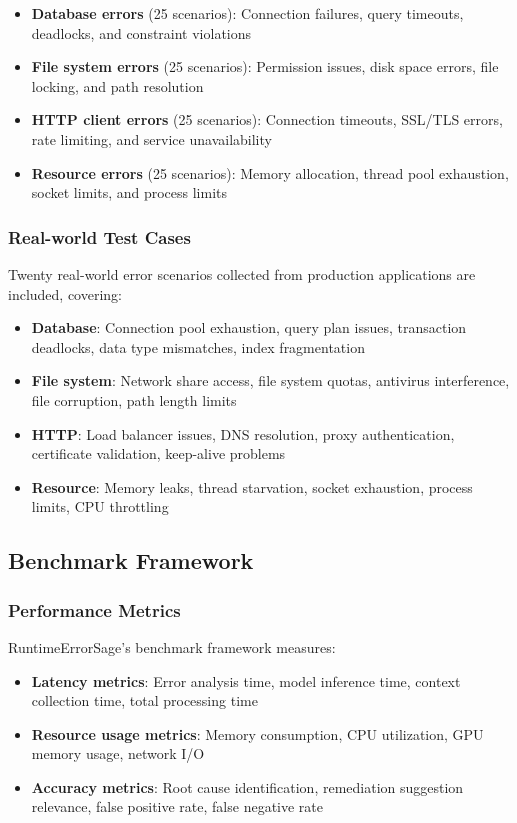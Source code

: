\begin{itemize}
\item \textbf{Database errors} (25 scenarios): Connection failures, query timeouts, deadlocks, and constraint violations
\item \textbf{File system errors} (25 scenarios): Permission issues, disk space errors, file locking, and path resolution
\item \textbf{HTTP client errors} (25 scenarios): Connection timeouts, SSL/TLS errors, rate limiting, and service unavailability
\item \textbf{Resource errors} (25 scenarios): Memory allocation, thread pool exhaustion, socket limits, and process limits
\end{itemize}

\subsubsection{Real-world Test Cases}
Twenty real-world error scenarios collected from production applications are included, covering:

\begin{itemize}
\item \textbf{Database}: Connection pool exhaustion, query plan issues, transaction deadlocks, data type mismatches, index fragmentation
\item \textbf{File system}: Network share access, file system quotas, antivirus interference, file corruption, path length limits
\item \textbf{HTTP}: Load balancer issues, DNS resolution, proxy authentication, certificate validation, keep-alive problems
\item \textbf{Resource}: Memory leaks, thread starvation, socket exhaustion, process limits, CPU throttling
\end{itemize}

\subsection{Benchmark Framework}

\subsubsection{Performance Metrics}
RuntimeErrorSage's benchmark framework measures:

\begin{itemize}
\item \textbf{Latency metrics}: Error analysis time, model inference time, context collection time, total processing time
\item \textbf{Resource usage metrics}: Memory consumption, CPU utilization, GPU memory usage, network I/O
\item \textbf{Accuracy metrics}: Root cause identification, remediation suggestion relevance, false positive rate, false negative rate
\end{itemize}

